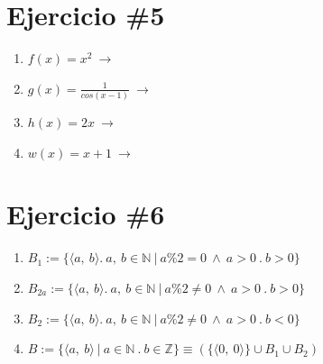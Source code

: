\documentclass[11pt,letterpaper]{article}
\begin{document}
\section{Ejercicio \#5}

\begin{enumerate}
\item $f(x)=x^2 \ \rightarrow \ \ $
\item $g(x)=\frac{1}{cos(x-1)} \ \rightarrow \ \ $
\item $h(x)=2x \ \rightarrow \ \ $
\item $w(x)=x+1 \ \rightarrow \ \ $
\end{enumerate}


\section{Ejercicio \#6}
\begin{enumerate}
\item $B_1 := \{ \langle a,\ b \rangle .\ a,\ b \in \mathbb{N}\ |\ a\%2=0\ \wedge\ a>0\ .\ b>0\}$
\item $B_{2a} := \{ \langle a,\ b \rangle .\ a,\ b \in \mathbb{N}\ |\ a\%2 \ne 0\ \wedge\ a>0\ .\ b>0\}$
\item $B_2 := \{ \langle a,\ b \rangle .\ a,\ b \in \mathbb{N}\ |\ a\%2 \ne 0\ \wedge\ a>0\ .\ b<0\}$
\item $B := \{ \langle a,\ b \rangle\ |\ a \in \mathbb{N}\ .\ b \in \mathbb{Z}\} \equiv (\{ \langle0,\ 0 \rangle \} \cup B_1 \cup B_2)$
\end{enumerate}
\end{document}
